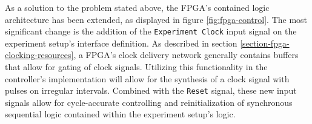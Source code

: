 \documentclass[main.tex]{subfiles}
\begin{document}
As a solution to the problem stated above, the FPGA's contained logic architecture has been extended, as displayed in figure \ref{fig:fpga-control}. The most significant change is the addition of the \texttt{Experiment Clock} input signal on the experiment setup's interface definition. As described in section \ref{section-fpga-clocking-resources}, a FPGA's clock delivery network generally contains buffers that allow for gating of clock signals. Utilizing this functionality in the controller's implementation will allow for the synthesis of a clock signal with pulses on irregular intervals. Combined with the \texttt{Reset} signal, these new input signals allow for cycle-accurate controlling and reinitialization of synchronous sequential logic contained within the experiment setup's logic.



\end{document}
